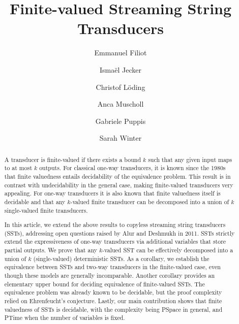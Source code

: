 \documentclass{article}
\author{Emmanuel Filiot \and Ismaël Jecker \and Christof Löding \and Anca Muscholl \and Gabriele Puppis \and Sarah Winter}\date{}
\title{Finite-valued Streaming String Transducers}
\begin{document}
\maketitle


\begin{abstract}
       A  transducer is finite-valued if there exists a bound
    $k$ such that any given
    input maps to at most $k$ outputs. For classical
    one-way transducers, it is known since the 1980s that
    finite valuedness entails decidability of the equivalence
    problem. This result is in contrast with undecidability in the
    general case, making finite-valued transducers
    very appealing. For one-way transducers it is also known that
    finite valuedness itself is decidable and that any
    $k$-valued finite transducer can be decomposed into a union of $k$
    single-valued finite transducers. 


    In this article, we extend the above results to copyless streaming string
    transducers (SSTs), addressing open questions raised by Alur and
    Deshmukh in 2011. SSTs strictly extend the expressiveness of
    one-way transducers via additional variables that store
    partial outputs. We prove that any $k$-valued SST can be
    effectively decomposed into a union of $k$ (single-valued)
    deterministic SSTs. As a corollary, we establish the equivalence
    between SSTs and two-way transducers in the finite-valued case, even though these models are generally incomparable. Another corollary provides an elementary upper bound for
    deciding equivalence of finite-valued SSTs. The equivalence problem was already
    known to be decidable, but the proof complexity relied
    on Ehrenfeucht's
    conjecture. Lastly, our main contribution shows that finite valuedness of SSTs is
    decidable, with the complexity  being {\upshape\sc PSpace} in general, and  {\upshape\sc PTime} when the
    number of variables is fixed.  
\end{abstract}

 
\end{document}
